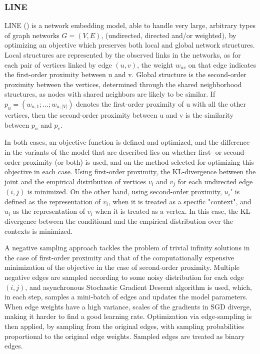 \subsubsection*{LINE}

LINE (\cite{DBLP:journals/corr/TangQWZYM15}) is a network embedding model, able to handle very large, arbitrary types of graph networks $G=(V,E)$, (undirected, directed and/or weighted), by optimizing an objective which preserves both local and global network structures. Local structures are represented by the observed links in the networks, as for each pair of vertices linked by edge $(u, v)$, the weight $w_{uv}$ on that edge indicates the first-order proximity between u and v. Global structure is the second-order proximity between the vertices, determined through the shared neighborhood structures, as nodes with shared neighbors are likely to be similar. If $p_u = (w_{u,1}; \dots ;w_{u,|V|})$ denotes the first-order proximity of u with all the other vertices, then the second-order proximity between u and v is the similarity between $p_u$ and $p_v$.

In both cases, an objective function is defined and optimized, and the difference in the variants of the model that are described lies on whether first- or second-order proximity (or both) is used, and on the method selected for optimizing this objective in each case. Using first-order proximity, the KL-divergence between the joint and the empirical distribution of vertices $v_i$ and $v_j$ for each undirected edge $(i,j)$ is minimized. On the other hand, using second-order proximity, $u_i'$ is defined as the representation of $v_i$, when it is treated as a specific "context", and $u_i$ as the representation of $v_i$ when it is treated as a vertex. In this case, the KL-divergence between the conditional and the empirical distribution over the contexts is minimized.

A negative sampling approach tackles the problem of trivial infinity solutions in the case of first-order proximity and that of the computationally expensive minimization of the objective in the case of second-order proximity. Multiple negative edges are sampled according to some noisy distribution for each edge $(i,j)$, and asynchronous Stochastic Gradient Descent algorithm is used, which, in each step, samples a mini-batch of edges and updates the model parameters.
When edge weights have a high variance, scales of the gradients in SGD diverge, making it harder to find a good learning rate. Optimization via edge-sampling is then applied, by sampling from the original edges, with sampling probabilities proportional to the original edge weights. Sampled edges are treated as binary edges.

